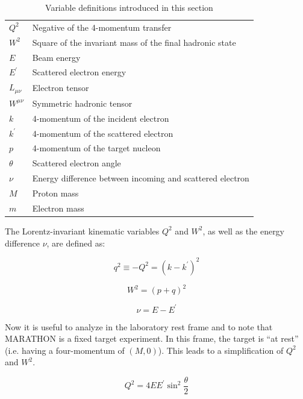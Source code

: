 \begin{table}
\center
\begin{tabular}{|l|l|}
\hline 
$Q^2$ & Negative of the 4-momentum transfer \\
$W^2$ & Square of the invariant mass of the final hadronic state \\
$E$ & Beam energy \\
$E^\prime$ & Scattered electron energy \\
$L_{\mu\nu}$ & Electron tensor \\
$W^{\mu\nu}$ & Symmetric hadronic tensor \\
$k$ & 4-momentum of the incident electron \\
$k^\prime$ & 4-momentum of the scattered electron \\
$p$ & 4-momentum of the target nucleon \\
$\theta$ & Scattered electron angle \\
$\nu$ & Energy difference between incoming and scattered electron \\
$M$ & Proton mass \\
$m$ & Electron mass \\
\hline
\end{tabular}
\caption{Variable definitions introduced in this section}
\label{tab:var_def}
\end{table}

The Lorentz-invariant kinematic variables $Q^2$ and $W^2$, as well as the energy difference $\nu$, are defined as:

\begin{equation}
	q^2 \equiv -Q^2 = \left(k-k^\prime\right)^2
\end{equation}

\begin{equation}
	W^2 = \left(p+q\right)^2
\end{equation}

\begin{equation}
	\nu = E-E^\prime
\end{equation}

Now it is useful to analyze in the laboratory rest frame and to note that MARATHON is a fixed target experiment. In this frame, the target is ``at rest'' (i.e. having a four-momentum of $\left(M,0\right)$). This leads to a simplification of $Q^2$ and $W^2$.

\begin{equation}
	Q^2 = 4EE^\prime\sin^2\frac{\theta}{2}
\end{equation}

